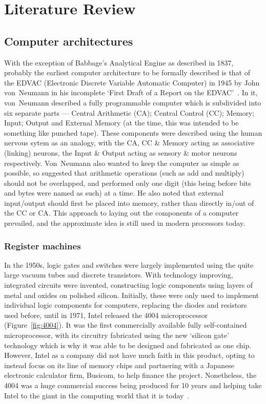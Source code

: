 \chapter{Literature Review}\label{ch:litreview}
\section{Computer architectures}
With the exception of Babbage's Analytical Engine as described in 1837, probably
the earliest computer architecture to be formally described is that of the EDVAC
(Electronic Discrete Variable Automatic Computer) in 1945 by John von~Neumann in
his incomplete `First Draft of a Report on the EDVAC'~\cite{FirstDraft}. In it,
von~Neumann described a fully programmable computer which is subdivided into six
separate parts --- Central Arithmetic (CA); Central Control (CC); Memory; Input;
Output and External Memory (at the time, this was intended to be something like
punched tape). These components were described using the human nervous sytem as
an analogy, with the CA, CC \& Memory acting as associative (linking) neurons,
the Input \& Output acting as sensory \& motor neurons respectively.
Von~Neumann also wanted to keep the computer as simple as possible, so suggested
that arithmetic operations (such as add and multiply) should not be overlapped,
and performed only one digit (this being before bits and bytes were named as
such) at a time. He also noted that external input/output should first be placed
into memory, rather than directly in/out of the CC or CA\@. This approach to
laying out the components of a computer prevailed, and the approximate idea is
still used in modern processors today.

\subsection{Register machines}

In the 1950s, logic gates and switches were largely implemented using the quite
large vacuum tubes and discrete transistors. With technology improving,
integrated circuits were invented, constructing logic components using layers of
metal and oxides on polished silicon. Initially, these were only used to
implement individual logic components for computers, replacing the diodes and
resistors used before, until in 1971, Intel released the 4004 microprocessor
(Figure~\ref{fig:4004}). It was the first commercially available fully
self-contained microprocessor, with its circuitry fabricated using the new
`silicon gate' technology which is why it was able to be designed and fabricated
as one chip. However, Intel as a company did not have much faith in this
product, opting to instead focus on its line of memory chips and partnering with
a Japanese electronic calculator firm, Busicom, to help finance the project.
Nonetheless, the 4004 was a huge commercial success being produced for 10 years
and helping take Intel to the giant in the computing world that it is
today~\cite{Aspray1997Intel}.

